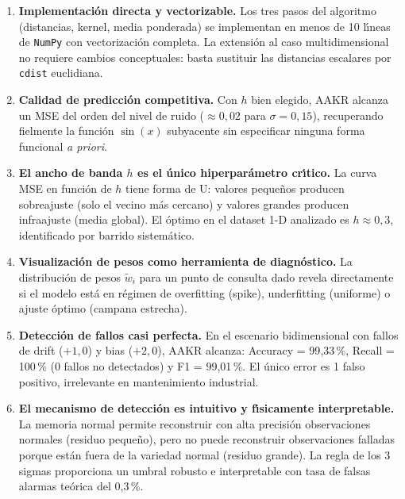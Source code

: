 \documentclass[12pt,a4paper]{article}
\begin{document}
\begin{enumerate}[leftmargin=2em, label=\textbf{\arabic*.}]

  \item \textbf{Implementaci\'on directa y vectorizable.} Los tres pasos del
        algoritmo (distancias, kernel, media ponderada) se implementan en menos
        de 10 l\'{\i}neas de \texttt{NumPy} con vectorizaci\'on completa. La extensi\'on
        al caso multidimensional no requiere cambios conceptuales: basta sustituir
        las distancias escalares por \texttt{cdist} euclidiana.

  \item \textbf{Calidad de predicci\'on competitiva.} Con $h$ bien elegido, AAKR
        alcanza un MSE del orden del nivel de ruido ($\approx 0{,}02$ para
        $\sigma = 0{,}15$), recuperando fielmente la funci\'on $\sin(x)$ subyacente
        sin especificar ninguna forma funcional \emph{a priori}.

  \item \textbf{El ancho de banda $h$ es el \'unico hiperpar\'ametro cr\'{\i}tico.}
        La curva MSE en funci\'on de $h$ tiene forma de U: valores peque\~nos
        producen sobreajuste (solo el vecino m\'as cercano) y valores grandes
        producen infraajuste (media global). El \'optimo en el dataset 1-D
        analizado es $h \approx 0{,}3$, identificado por barrido sistem\'atico.

  \item \textbf{Visualizaci\'on de pesos como herramienta de diagn\'ostico.}
        La distribuci\'on de pesos $\tilde{w}_i$ para un punto de consulta
        dado revela directamente si el modelo est\'a en r\'egimen de overfitting
        (spike), underfitting (uniforme) o ajuste \'optimo (campana estrecha).

  \item \textbf{Detecci\'on de fallos casi perfecta.} En el escenario bidimensional
        con fallos de drift ($+1{,}0$) y bias ($+2{,}0$), AAKR alcanza:
        Accuracy = 99{,}33\,\%, Recall = 100\,\% (0 fallos no detectados) y
        F1 = 99{,}01\,\%. El \'unico error es 1 falso positivo, irrelevante en
        mantenimiento industrial.

  \item \textbf{El mecanismo de detecci\'on es intuitivo y f\'{\i}sicamente
        interpretable.} La memoria normal permite reconstruir con alta precisi\'on
        observaciones normales (residuo peque\~no), pero no puede reconstruir
        observaciones falladas porque est\'an fuera de la variedad normal (residuo
        grande). La regla de los 3 sigmas proporciona un umbral robusto e
        interpretable con tasa de falsas alarmas te\'orica del 0{,}3\,\%.


\end{enumerate}
\end{document}
